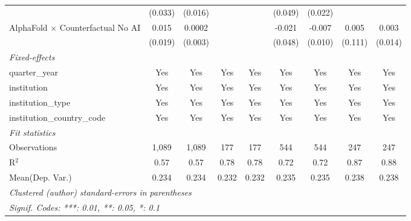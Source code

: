 \begin{tabular}{lcccccccc}
                                            & (0.033) & (0.016) &         &         & (0.049) & (0.022) &         &   \\   
   AlphaFold $\times$ Counterfactual No AI  & 0.015   & 0.0002  &         &         & -0.021  & -0.007  & 0.005   & 0.003\\   
                                            & (0.019) & (0.003) &         &         & (0.048) & (0.010) & (0.111) & (0.014)\\   
   \midrule
   \emph{Fixed-effects}\\
   quarter\_year                            & Yes     & Yes     & Yes     & Yes     & Yes     & Yes     & Yes     & Yes\\  
   institution                              & Yes     & Yes     & Yes     & Yes     & Yes     & Yes     & Yes     & Yes\\  
   institution\_type                        & Yes     & Yes     & Yes     & Yes     & Yes     & Yes     & Yes     & Yes\\  
   institution\_country\_code               & Yes     & Yes     & Yes     & Yes     & Yes     & Yes     & Yes     & Yes\\  
   \midrule
   \emph{Fit statistics}\\
   Observations                             & 1,089   & 1,089   & 177     & 177     & 544     & 544     & 247     & 247\\  
   R$^2$                                    & 0.57    & 0.57    & 0.78    & 0.78    & 0.72    & 0.72    & 0.87    & 0.88\\  
Mean(Dep. Var.) & 0.234 & 0.234 & 0.232 & 0.232 & 0.235 & 0.235 & 0.238 & 0.238 \\
   \midrule \midrule
   \multicolumn{9}{l}{\emph{Clustered (author) standard-errors in parentheses}}\\
   \multicolumn{9}{l}{\emph{Signif. Codes: ***: 0.01, **: 0.05, *: 0.1}}\\
\end{tabular}
\par\endgroup
